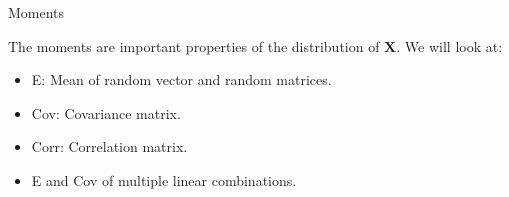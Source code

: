 \documentclass[ignorenonframetext,]{beamer}
\providecommand{\tightlist}{%
  \setlength{\itemsep}{0pt}\setlength{\parskip}{0pt}}
\begin{document}
\begin{frame}

\begin{block}{Moments}

\vspace{2mm}

The moments are important properties of the distribution of
\(\boldsymbol{X}\). We will look at:

\vspace{2mm}

\begin{itemize}
\tightlist
\item
  E: Mean of random vector and random matrices.
\item
  Cov: Covariance matrix.
\item
  Corr: Correlation matrix.
\item
  E and Cov of multiple linear combinations.
\end{itemize}

\end{block}

\end{frame}
\end{document}
